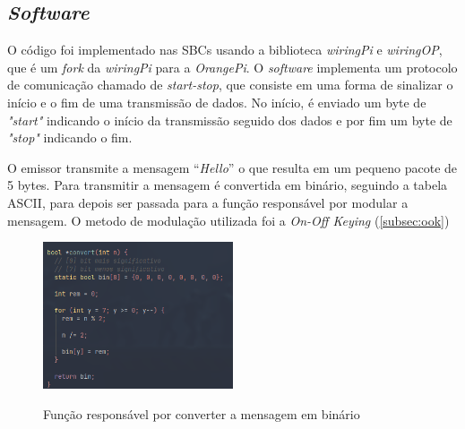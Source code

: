 \newpage

\subsection{\textit{Software}}

O código foi implementado nas SBCs usando a biblioteca \textit{wiringPi} e \textit{wiringOP}, que é um \textit{fork} da \textit{wiringPi} para a \textit{OrangePi}. O \textit{software} implementa um protocolo de comunicação chamado de \textit{start-stop}, que consiste em uma forma de sinalizar o início e o fim de uma transmissão de dados. No início, é enviado um byte de \textit{"start"} indicando o início da transmissão seguido dos dados e por fim um byte de \textit{"stop"} indicando o fim.

O emissor transmite a mensagem ``\textit{Hello}” o que resulta em um pequeno pacote de 5 bytes. Para transmitir a mensagem é convertida em binário, seguindo a tabela ASCII, para depois ser passada para a função responsável por modular a mensagem. O metodo de modulação utilizada foi a \textit{On-Off Keying} (\autoref{subsec:ook})

\begin{figure}[!htbp]
  \caption{Função responsável por converter a mensagem em binário}
  \includegraphics[width=0.5\textwidth]{images/convert_emissor.png}
  \label{convert_emissor}
\end{figure}


